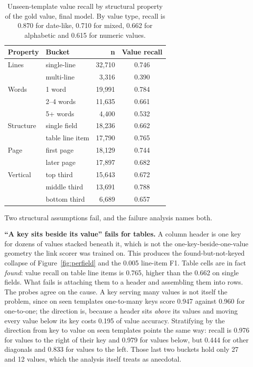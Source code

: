 \documentclass[11pt,a4paper]{article}
\begin{document}
\begin{table}[htbp]
\centering\small
\begin{tabular}{@{}llrc@{}}
\toprule
\textbf{Property} & \textbf{Bucket} & \textbf{n} & \textbf{Value recall} \\
\midrule
Lines          & single-line      & 32{,}710 & 0.746 \\
               & multi-line       & 3{,}316  & 0.390 \\
Words          & 1 word           & 19{,}991 & 0.784 \\
               & 2--4 words       & 11{,}635 & 0.661 \\
               & 5+ words         & 4{,}400  & 0.532 \\
Structure      & single field     & 18{,}236 & 0.662 \\
               & table line item  & 17{,}790 & 0.765 \\
Page           & first page       & 18{,}129 & 0.744 \\
               & later page       & 17{,}897 & 0.682 \\
Vertical       & top third        & 15{,}643 & 0.672 \\
               & middle third     & 13{,}691 & 0.788 \\
               & bottom third     & 6{,}689  & 0.657 \\
\bottomrule
\end{tabular}
\caption{Unseen-template value recall by structural property of the gold value, final model. By
value type, recall is 0.870 for date-like, 0.710 for mixed, 0.662 for alphabetic and 0.615 for
numeric values.}
\label{tab:strata}
\end{table}

Two structural assumptions fail, and the failure analysis names both.

\textbf{``A key sits beside its value'' fails for tables.} A column header is one key for dozens
of values stacked beneath it, which is not the one-key-beside-one-value geometry the link scorer
was trained on. This produces the found-but-not-keyed collapse of Figure~\ref{fig:perfield} and
the 0.005 line-item F1. Table cells are in fact \emph{found}: value recall on table line items is
0.765, higher than the 0.662 on single fields. What fails is attaching them to a header and
assembling them into rows. The probes agree on the cause. A key serving many values is not itself
the problem, since on seen templates one-to-many keys score 0.947 against 0.960 for one-to-one;
the direction is, because a header sits \emph{above} its values and moving every value below its
key costs 0.195 of value accuracy. Stratifying by the direction from key to value on seen
templates points the same way: recall is 0.976 for values to the right of their key and 0.979 for
values below, but 0.444 for other diagonals and 0.833 for values to the left. Those last two
buckets hold only 27 and 12 values, which the analysis itself treats as anecdotal.
\end{document}
